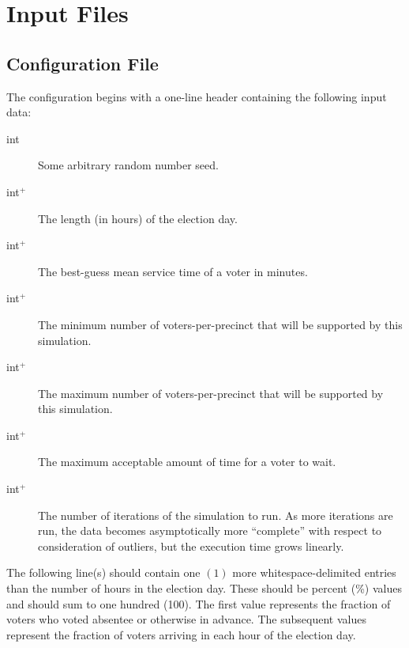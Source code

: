 %

\chapter{Input Files}

\section{Configuration File}

The configuration begins with a one-line header containing the following input data:

\begin{description}
\item[int] Some arbitrary random number seed.
\item[int$^+$] The length (in hours) of the election day.
\item[int$^+$] The best-guess mean service time of a voter in minutes.
\item[int$^+$] The minimum number of voters-per-precinct that will be supported by this simulation.
\item[int$^+$] The maximum number of voters-per-precinct that will be supported by this simulation.
\item[int$^+$] The maximum acceptable amount of time for a voter to wait.
\item[int$^+$] The number of iterations of the simulation to run. As more iterations are run, the data becomes asymptotically more ``complete'' with respect to consideration of outliers, but the execution time grows linearly.
\end{description}

The following line(s) should contain one $(1)$ more whitespace-delimited entries than the number of hours in the election day. These should be percent (\%) values and should sum to one hundred (100). The first value represents the fraction of voters who voted absentee or otherwise in advance. The subsequent values represent the fraction of voters arriving in each hour of the election day.
